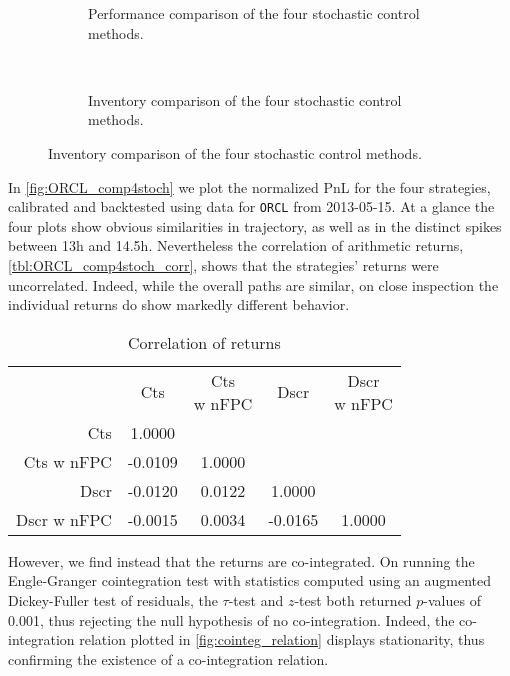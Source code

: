 \begin{figure}
  \centering
\begin{subfigure}{\linewidth}
  \setlength{} 
  \setlength\figurewidth{\linewidth}
  
  \caption{Performance comparison of the four stochastic control methods.}
  \label{fig:ORCL_comp4stoch}
\end{subfigure}\\
\vspace{1cm}
\begin{subfigure}{\linewidth}
  \centering
  \setlength\figureheight{\linewidth} 
  \setlength{}
  
  \caption{Inventory comparison of the four stochastic control methods.}
  \label{fig:ORCL_comp4stoch_inv}
\end{subfigure}%
\end{figure}
In \autoref{fig:ORCL_comp4stoch} we plot the normalized PnL for the four strategies, calibrated and backtested using data for \texttt{ORCL} from 2013-05-15. At a glance the four plots show obvious similarities in trajectory, as well as in the distinct spikes between 13h and 14.5h. Nevertheless the correlation of arithmetic returns, \autoref{tbl:ORCL_comp4stoch_corr}, shows that the strategies' returns were uncorrelated. Indeed, while the overall paths are similar, on close inspection the individual returns do show markedly different behavior.
\begin{table}[H]
\centering
{}
\begin{tabular}{@{} r *{4}{c} @{}}
\toprule
& Cts & \cellbreak{t}{c}{Cts \\ w nFPC} & Dscr & \cellbreak{t}{c}{Dscr \\ w nFPC} \\
\cmidrule{2-5}
Cts          &  1.0000  & & & \\
Cts w nFPC   & -0.0109  &  1.0000 &  & \\
Dscr         & -0.0120  &  0.0122 &   1.0000 &  \\
Dscr w nFPC  & -0.0015  &  0.0034 &  -0.0165 &   1.0000 \\
\bottomrule
\end{tabular}
\caption{Correlation of returns}
\label{tbl:ORCL_comp4stoch_corr}
\end{table}
However, we find instead that the returns are co-integrated. On running the Engle-Granger cointegration test with statistics computed using an augmented Dickey-Fuller test of residuals, the $\tau$-test and $z$-test both returned $p$-values of 0.001, thus rejecting the null hypothesis of no co-integration. Indeed, the co-integration relation plotted in \autoref{fig:cointeg_relation} displays stationarity, thus confirming the existence of a co-integration relation.
